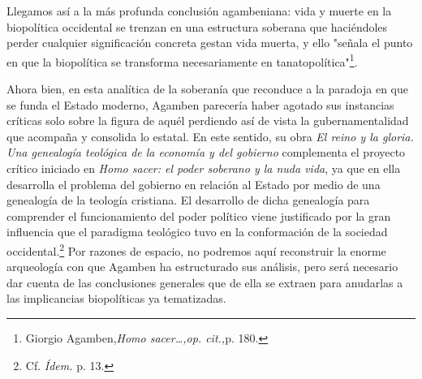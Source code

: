 Llegamos así a la más profunda conclusión agambeniana: vida y muerte en
la biopolítica occidental se trenzan en una estructura soberana que
haciéndoles perder cualquier significación concreta gestan vida muerta,
y ello "señala el punto en que la biopolítica se transforma
necesariamente en tanatopolítica"\footnote{Giorgio Agamben,\emph{Homo
  sacer\ldots,op. cit.,}p. 180.}.

Ahora bien, en esta analítica de la soberanía que reconduce a la
paradoja en que se funda el Estado moderno, Agamben parecería haber
agotado sus instancias críticas solo sobre la figura de aquél perdiendo
así de vista la gubernamentalidad que acompaña y consolida lo estatal.
En este sentido, su obra \emph{El reino y la gloria. Una genealogía
teológica de la economía y del gobierno} complementa el proyecto crítico
iniciado en \emph{Homo sacer: el poder soberano y la nuda vida}, ya que
en ella desarrolla el problema del gobierno en relación al Estado por
medio de una genealogía de la teología cristiana. El desarrollo de dicha
genealogía para comprender el funcionamiento del poder político viene
justificado por la gran influencia que el paradigma teológico tuvo en la
conformación de la sociedad occidental.\footnote{Cf. \emph{Ídem.} p. 13.}
Por razones de espacio, no podremos aquí reconstruir la enorme
arqueología con que Agamben ha estructurado sus análisis, pero será
necesario dar cuenta de las conclusiones generales que de ella se
extraen para anudarlas a las implicancias biopolíticas ya tematizadas.


